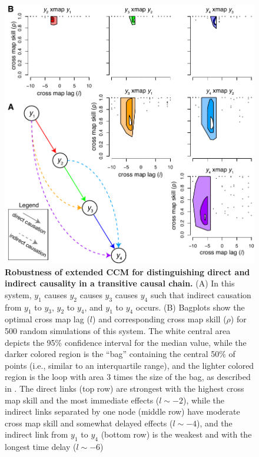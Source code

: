 \begin{figure}[!ht]
\begin{center}\includegraphics[scale = 0.9]{fig_lag_4sp_transitive_rand.pdf}\end{center}
\label{fig_lag_4sp_transitive_rand}
\caption[Robustness of extended CCM for distinguishing direct and indirect causality in a transitive causal chain.]{\textbf{Robustness of extended CCM for distinguishing direct and indirect causality in a transitive causal chain.}\newline
(A) In this system, $y_1$ causes $y_2$ causes $y_3$ causes $y_4$ such that indirect causation from $y_1$ to $y_3$, $y_2$ to $y_4$, and $y_1$ to $y_4$ occurs. (B) Bagplots show the optimal cross map lag ($l$) and corresponding cross map skill ($\rho$) for 500 random simulations of this system. The white central area depicts the 95\% confidence interval for the median value, while the darker colored region is the ``bag'' containing the central 50\% of points (i.e., similar to an interquartile range), and the lighter colored region is the loop with area 3 times the size of the bag, as described in \cite{Rousseeuw_1999}. The direct links (top row) are strongest with the highest cross map skill and the most immediate effects ($l \sim -2$), while the indirect links separated by one node (middle row) have moderate cross map skill and somewhat delayed effects ($l \sim -4$), and the indirect link from $y_1$ to $y_4$ (bottom row) is the weakest and with the longest time delay ($l \sim -6$)}
\end{figure}

